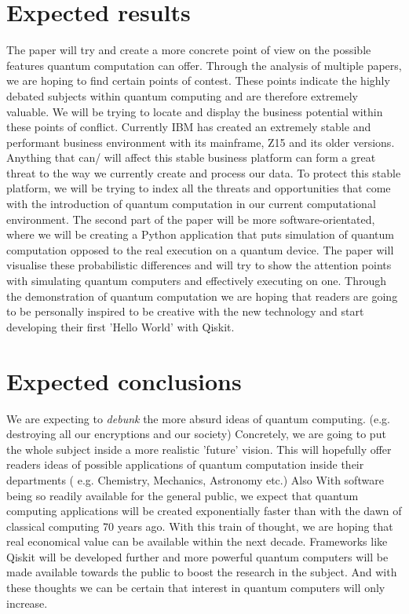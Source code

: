\section{Expected results}
\label{sec:Expected results}

 The paper will try and create a more concrete point of view on the possible features quantum computation can offer.
 Through the analysis of multiple papers, we are hoping to find certain points of contest. These points indicate the highly debated subjects within quantum computing and are therefore extremely valuable. We will be trying to locate and display the business potential within these points of conflict. Currently IBM has created an extremely stable and performant business environment with its mainframe, Z15 and its older versions. Anything that can/ will affect this stable business platform can form a great threat to the way we currently create and process our data. To protect this stable platform, we will be trying to index all the threats and opportunities that come with the introduction of quantum computation in our current computational environment. The second part of the paper will be more software-orientated, where we will be creating a Python application that puts simulation of quantum computation opposed to the real execution on a quantum device. The paper will visualise these probabilistic differences and will try to show the attention points with simulating quantum computers and effectively executing on one. Through the demonstration of quantum computation we are hoping that readers are going to be personally inspired to be creative with the new technology and start developing their first 'Hello World' with Qiskit.

\section{Expected conclusions}
\label{sec:Expected conclusions}

We are expecting to \emph{debunk} the more absurd ideas of quantum computing. (e.g. destroying all our encryptions and our society) Concretely, we are going to put the whole subject inside a more realistic 'future' vision. This will hopefully offer readers ideas of possible applications of quantum computation inside their departments ( e.g. Chemistry, Mechanics, Astronomy etc.) Also With software being so readily available for the general public, we expect that quantum computing applications will be created exponentially faster than with the dawn of classical computing 70 years ago. With this train of thought, we are hoping that real economical value can be available within the next decade. Frameworks like Qiskit will be developed further and more powerful quantum computers will be made available towards the public to boost the research in the subject. And with these thoughts we can be certain that interest in quantum computers will only increase.


